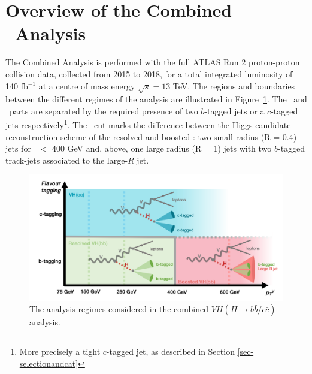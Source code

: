 \section[Overview of the Combined \vhbc\ Analysis]{Overview of the Combined \boldvhbc\ Analysis}
The Combined Analysis is performed with the full ATLAS Run 2 proton-proton collision data, collected from 2015 to 2018, for a total integrated luminosity of 140 fb$^{-1}$ at a centre of mass energy $\sqrt{s} = 13$ TeV. The regions and boundaries between the different regimes of the analysis are illustrated in Figure~\ref{fig:ana-strat}. The \vhb\ and \vhc\ parts are separated by the required presence of two $b$-tagged jets or a $c$-tagged jets respectively\footnote{More precisely a tight $c$-tagged jet, as described in Section \ref{sec-selectionandcat}}. The \ptv\ cut marks the difference between the Higgs candidate reconstruction scheme of the resolved and boosted \vhb: two small radius (R = 0.4) jets for \ptv\ $<$ 400 GeV and, above, one large radius (R = 1) jets with two $b$-tagged  track-jets associated to the large-$R$ jet.

\begin{figure}[h!]
\center
\includegraphics[width=\textwidth]{Images/VH/Cat/AnalysisRegime.png}
\caption{The analysis regimes considered in the combined $VH (H\rightarrow b\bar{b}/c\bar{c})$ analysis.} 
\label{fig:ana-strat}
\end{figure}


